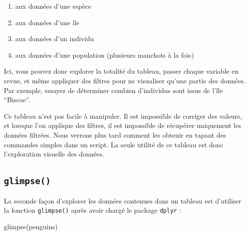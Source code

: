 \documentclass[
  a4paper,
  DIV=11,
  numbers=noendperiod,
  oneside]{scrreprt}
\newenvironment{Shaded}{}{}
\newcommand{\FunctionTok}[1]{\textcolor[rgb]{0.44,0.26,0.76}{#1}}
\newcommand{\NormalTok}[1]{\textcolor[rgb]{0.14,0.16,0.18}{#1}}
\providecommand{\tightlist}{%
  \setlength{\itemsep}{0pt}\setlength{\parskip}{0pt}}\usepackage{longtable,booktabs,array}
\begin{document}
\begin{tcolorbox}[enhanced jigsaw, colbacktitle=quarto-callout-tip-color!10!white, left=2mm, leftrule=.75mm, titlerule=0mm, bottomtitle=1mm, colback=white, breakable, arc=.35mm, bottomrule=.15mm, toprule=.15mm, toptitle=1mm, opacitybacktitle=0.6, title=\textcolor{quarto-callout-tip-color}{\faLightbulb}\hspace{0.5em}{Quizz : à quoi correspondent chacune des lignes de ce tableau ?}, coltitle=black, rightrule=.15mm, opacityback=0, colframe=quarto-callout-tip-color-frame]

\begin{enumerate}
\def\labelenumi{\alph{enumi}.}
\tightlist
\item
  aux données d'une espèce
\item
  aux données d'une île
\item
  aux données d'un individu
\item
  aux données d'une population (plusieurs manchots à la fois)
\end{enumerate}

\end{tcolorbox}

Ici, vous pouvez donc explorer la totalité du tableau, passer chaque
variable en revue, et même appliquer des filtres pour ne visualiser
qu'une partie des données. Par exemple, essayez de déterminer combien
d'individus sont issus de l'île ``Biscoe''.

Ce tableau n'est pas facile à manipuler. Il est impossible de corriger
des valeurs, et lorsque l'on applique des filtres, il est impossible de
récupérer uniquement les données filtrées. Nous verrons plus tard
comment les obtenir en tapant des commandes simples dans un script. La
seule utilité de ce tableau est donc l'exploration visuelle des données.

\subsection{\texorpdfstring{\texttt{glimpse()}}{glimpse()}}\label{glimpse}

La seconde façon d'explorer les données contenues dans un tableau est
d'utiliser la fonction \texttt{glimpse()} après avoir chargé le package
\texttt{dplyr} :

\begin{Shaded}
\begin{Highlighting}[]
\FunctionTok{glimpse}\NormalTok{(penguins)}
\end{Highlighting}
\end{Shaded}
\end{document}
